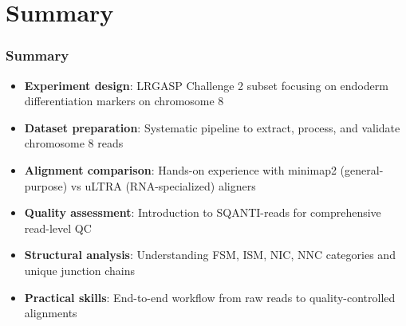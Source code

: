 \documentclass[aspectratio=169]{beamer}
\begin{document}
\section{Summary}

\begin{frame}
  \frametitle{Summary}
  \begin{itemize}
    \item \textbf{Experiment design}: LRGASP Challenge 2 subset focusing on endoderm differentiation markers on chromosome 8
    \item \textbf{Dataset preparation}: Systematic pipeline to extract, process, and validate chromosome 8 reads
    \item \textbf{Alignment comparison}: Hands-on experience with minimap2 (general-purpose) vs uLTRA (RNA-specialized) aligners
    \item \textbf{Quality assessment}: Introduction to SQANTI-reads for comprehensive read-level QC
    \item \textbf{Structural analysis}: Understanding FSM, ISM, NIC, NNC categories and unique junction chains
    \item \textbf{Practical skills}: End-to-end workflow from raw reads to quality-controlled alignments
  \end{itemize}
\end{frame}

\end{document}
